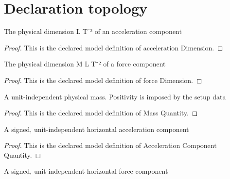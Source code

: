 \section{Declaration topology}
\begin{definition}
  \label{def:physics:phyx-mini-0804:phyxminiproblems-problemphyxmini0804-accelerationdimension}
  The physical dimension L T⁻² of an acceleration component
\end{definition}
\begin{proof}
  This is the declared model definition of acceleration Dimension.
\end{proof}
\begin{definition}
  \label{def:physics:phyx-mini-0804:phyxminiproblems-problemphyxmini0804-forcedimension}
  The physical dimension M L T⁻² of a force component
\end{definition}
\begin{proof}
  This is the declared model definition of force Dimension.
\end{proof}
\begin{definition}
  \label{def:physics:phyx-mini-0804:phyxminiproblems-problemphyxmini0804-massquantity}
  A unit-independent physical mass. Positivity is imposed by the setup data
\end{definition}
\begin{proof}
  This is the declared model definition of Mass Quantity.
\end{proof}
\begin{definition}
  \label{def:physics:phyx-mini-0804:phyxminiproblems-problemphyxmini0804-accelerationcomponentquantity}
  A signed, unit-independent horizontal acceleration component
\end{definition}
\begin{proof}
  This is the declared model definition of Acceleration Component Quantity.
\end{proof}
\begin{definition}
  \label{def:physics:phyx-mini-0804:phyxminiproblems-problemphyxmini0804-forcecomponentquantity}
  A signed, unit-independent horizontal force component
\end{definition}
